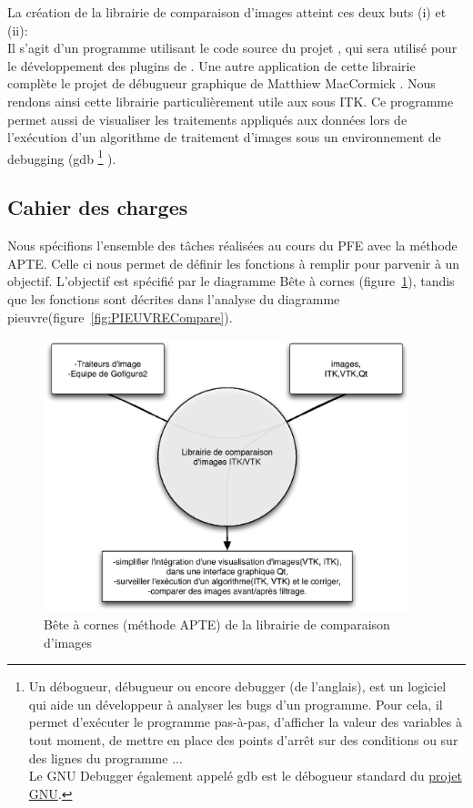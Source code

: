 La création de la librairie de comparaison d'images atteint ces deux buts (i) et (ii):\\ 
Il s'agit d'un programme utilisant le code source du projet {\gofigure}, 
qui sera utilisé pour le développement des plugins de {\gofigure}.
Une autre application de cette librairie complète le projet de débugueur graphique de 
Matthiew MacCormick \cite{McCornic-VisualDebug}. Nous rendons ainsi cette librairie particulièrement utile
aux sous ITK.
Ce programme permet aussi de visualiser les traitements appliqués aux données
lors de l'exécution d'un algorithme de traitement d'images sous un environnement de debugging (gdb
\footnote{Un débogueur, débugueur ou encore debugger (de l'anglais), est un logiciel qui aide un développeur à analyser les bugs d'un programme. Pour cela, il permet d'exécuter le programme pas-à-pas, d'afficher la valeur des variables à tout moment, de mettre en place des points d'arrêt sur des conditions ou sur des lignes du programme ...\\
Le GNU Debugger également appelé gdb est le débogueur standard du \href{http://fr.wikipedia.org/wiki/Projet_GNU}{projet GNU}.} ).


\subsection{Cahier des charges}

Nous spécifions l'ensemble des tâches réalisées au cours du PFE avec la méthode APTE{\textregistered}{\cite{methodeAPTE}}. Celle ci nous permet de définir les fonctions à remplir pour parvenir à un objectif. L'objectif est spécifié par le diagramme Bête à cornes (figure~\ref{fig:BACCompare}), tandis que les fonctions sont décrites dans l'analyse du diagramme pieuvre(figure~\ref{fig:PIEUVRECompare}).

\begin{figure}[h]
\begin{center}
\leavevmode
\includegraphics[width=0.95\textwidth]{pictures/CompareBAC}
\end{center}
\caption{Bête à cornes (méthode {APTE\textregistered}) de la librairie de comparaison d'images}
\label{fig:BACCompare}
\end{figure}

